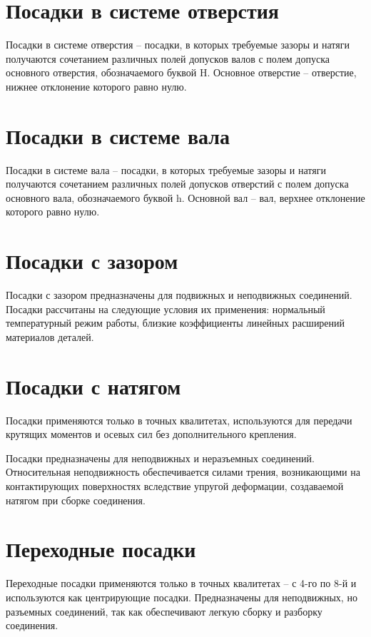 \section{Посадки в системе отверстия}

Посадки в системе отверстия – посадки, в которых требуемые зазоры и натяги получаются сочетанием различных полей допусков валов с полем допуска основного отверстия, обозначаемого буквой H. Основное отверстие – отверстие, нижнее отклонение которого равно нулю.

\section{Посадки в системе вала}

Посадки в системе вала – посадки, в которых требуемые зазоры и натяги получаются сочетанием различных полей допусков отверстий с полем допуска основного вала, обозначаемого буквой h. Основной вал – вал, верхнее отклонение которого равно нулю.

\section{Посадки с зазором}

Посадки с зазором предназначены для подвижных и неподвижных соединений. Посадки рассчитаны на следующие условия их применения: нормальный температурный режим работы, близкие коэффициенты линейных расширений материалов деталей.

\section{Посадки с натягом}

 Посадки применяются только в точных квалитетах, используются для передачи крутящих моментов и осевых сил без дополнительного крепления.

Посадки предназначены для неподвижных и неразъемных соединений. Относительная неподвижность обеспечивается силами трения, возникающими на контактирующих поверхностях вследствие упругой деформации, создаваемой натягом при сборке соединения.

\section{Переходные посадки}

 Переходные посадки применяются только в точных квалитетах – с 4-го по 8-й и используются как центрирующие посадки. Предназначены для неподвижных, но разъемных соединений, так как обеспечивают легкую сборку и разборку соединения.

